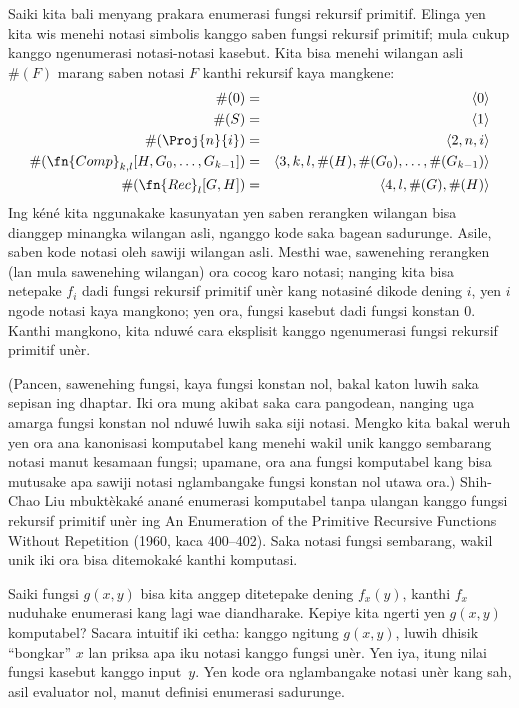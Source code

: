 \documentclass[../../../include/open-logic-section]{subfiles}
\begin{document}
Saiki kita bali menyang prakara enumerasi
fungsi rekursif primitif. Elinga yen kita wis
menehi notasi simbolis kanggo saben fungsi
rekursif primitif; mula cukup kanggo
ngenumerasi notasi-notasi kasebut. Kita bisa
menehi wilangan asli $\#(F)$ marang saben
notasi $F$ kanthi rekursif kaya mangkene:
\begin{eqnarray*}
\#(0) & = & \langle 0 \rangle \\
\#(S) & = & \langle 1 \rangle \\
\#(\Proj{n}{i}) & = & \langle 2, n, i \rangle \\
\#(\fn{Comp}_{k,l}[H,G_0,\dots,G_{k-1}]) & = & \langle
3,k,l,\#(H),\#(G_0),\dots,\#(G_{k-1}) \rangle \\
\#(\fn{Rec}_l[G,H]) & = & \langle 4, l, \#(G), \#(H) \rangle
\end{eqnarray*}
Ing kéné kita nggunakake kasunyatan yen saben
rerangken wilangan bisa dianggep minangka
wilangan asli, nganggo kode saka bagean sadurunge.
Asile, saben kode notasi oleh sawiji wilangan asli.
Mesthi wae, sawenehing rerangken (lan mula
sawenehing wilangan) ora cocog karo notasi;
nanging kita bisa netepake $f_i$ dadi fungsi
rekursif primitif unèr kang notasiné dikode
dening $i$, yen $i$ ngode notasi kaya mangkono;
yen ora, fungsi kasebut dadi fungsi konstan $0$.
Kanthi mangkono, kita nduwé cara eksplisit
kanggo ngenumerasi fungsi rekursif primitif
unèr.

(Pancen, sawenehing fungsi, kaya fungsi
konstan nol, bakal katon luwih saka sepisan
ing dhaptar. Iki ora mung akibat saka cara
pangodean, nanging uga amarga fungsi konstan
nol nduwé luwih saka siji notasi. Mengko kita
bakal weruh yen ora ana kanonisasi komputabel kang menehi wakil unik kanggo sembarang notasi manut kesamaan fungsi; upamane,
ora ana fungsi komputabel kang bisa mutusake
apa sawiji notasi nglambangake fungsi
konstan nol utawa ora.) Shih-Chao Liu mbuktèkaké anané enumerasi komputabel tanpa ulangan kanggo fungsi rekursif primitif unèr ing An Enumeration of the Primitive Recursive Functions Without Repetition (1960, kaca 400–402). Saka notasi fungsi sembarang, wakil unik iki ora bisa ditemokaké kanthi komputasi.

Saiki fungsi $g(x,y)$ bisa kita anggep
ditetepake dening $f_x(y)$, kanthi $f_x$
nuduhake enumerasi kang lagi wae diandharake.
Kepiye kita ngerti yen $g(x,y)$ komputabel?
Sacara intuitif iki cetha: kanggo ngitung
$g(x,y)$, luwih dhisik ``bongkar'' $x$
lan priksa apa iku notasi kanggo fungsi
unèr. Yen iya, itung nilai fungsi kasebut
kanggo input~$y$. Yen kode ora nglambangake notasi unèr kang sah, asil evaluator nol, manut definisi enumerasi sadurunge.
\end{document}
